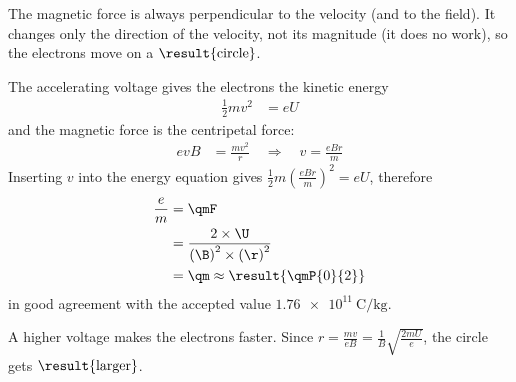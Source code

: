 \begin{abcliste}
\abc The magnetic force is always perpendicular to the velocity (and to the field). It changes only the direction of the velocity, not its magnitude (it does no work), so the electrons move on a $\result{\text{circle}}$.

\abc The accelerating voltage gives the electrons the kinetic energy
\begin{align}
 \frac{1}{2}m v^2 &= e U
\end{align}
and the magnetic force is the centripetal force:
\begin{align}
 e v B &= \frac{m v^2}{r} \quad\Longrightarrow\quad v = \frac{e B r}{m}
\end{align}
Inserting $v$ into the energy equation gives $\frac{1}{2}m\left(\frac{eBr}{m}\right)^2 = eU$, therefore
\begin{align}
 \frac{e}{m} &= \qmF \\
   &= \frac{2\times\U}{\left(\B\right)^2\times\left(\r\right)^2} \\
   &= \qm \approx \result{\qmP{0}{2}}
\end{align}
in good agreement with the accepted value $\SI{1.76e11}{\coulomb\per\kg}$.

\abc A higher voltage makes the electrons faster. Since $r = \frac{m v}{e B} = \frac{1}{B}\sqrt{\frac{2 m U}{e}}$, the circle gets $\result{\text{larger}}$.
\end{abcliste}
